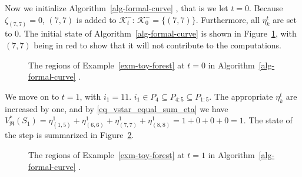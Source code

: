 \documentclass[
  11pt,
  a4paper,
]{article}
\theoremstyle{plain}
\theoremstyle{plain}
\theoremstyle{plain}
\theoremstyle{definition}
\theoremstyle{definition}
\theoremstyle{remark}
\begin{document}
Now we initialize  Algorithm~\ref{alg-formal-curve} , that is we let
\(t=0\). Because \(\zeta_{(7,7)}=0\), \((7, 7)\) is added to
\(\mathcal{K}^-_t\): \(\mathcal{K}^-_0=\{(7, 7)\}\). Furthermore, all
\(\eta_k^t\) are set to 0. The initial state of
 Algorithm~\ref{alg-formal-curve}  is shown in Figure~\ref{fig-t0}, with
\((7, 7)\) being in red to show that it will not contribute to the
computations.

\begin{figure}


\caption{\label{fig-t0}The regions of Example~\ref{exm-toy-forest} at
\(t=0\) in  Algorithm~\ref{alg-formal-curve} .}

\end{figure}%

We move on to \(t=1\), with \(i_1=11\).
\(i_1\in P_4\subseteq P_{4:5}\subseteq P_{1:5}\). The appropriate
\(\eta_k^t\) are increased by one, and by \eqref{eq_vstar_equal_sum_eta}
we have
\(V^*_{\mathfrak{R}}(S_1)=\eta_{(1, 5)}^1+\eta_{(6, 6)}^1+\eta_{(7, 7)}^1+\eta_{(8, 8)}^1=1+0+0+0=1\).
The state of the step is summarized in Figure~\ref{fig-t1}.

\begin{figure}


\caption{\label{fig-t1}The regions of Example~\ref{exm-toy-forest} at
\(t=1\) in  Algorithm~\ref{alg-formal-curve} .}

\end{figure}%
\end{document}
